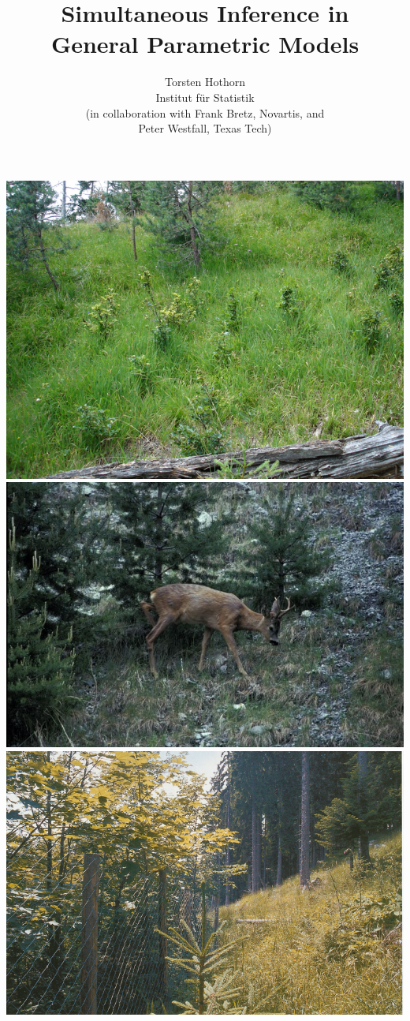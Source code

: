 \documentclass[landscape]{slides}
\title{Simultaneous Inference in \\ General Parametric Models}
\author{Torsten Hothorn \\ Institut für Statistik \\ 
(in collaboration with Frank Bretz, Novartis, and \\ Peter Westfall, Texas Tech)}
\begin{document}
\maketitle


\begin{center}
\includegraphics{figs/verbiss}
\includegraphics{figs/reh}
\includegraphics{figs/zaun}

\end{center}
\end{document}
